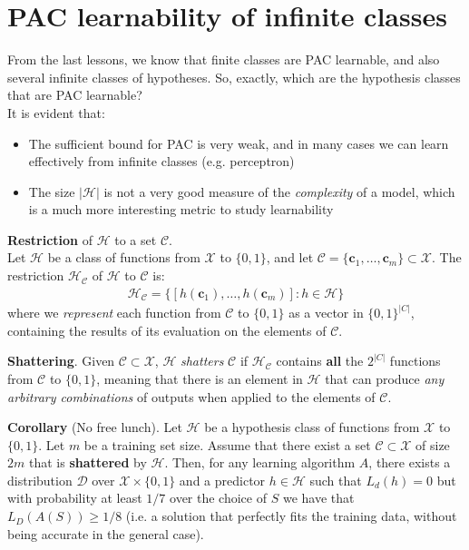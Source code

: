 \documentclass[../template.tex]{subfiles}
\begin{document}
\section{PAC learnability of infinite classes}
From the last lessons, we know that finite classes are PAC learnable, and also several infinite classes of hypotheses. So, exactly, which are the hypothesis classes that are PAC learnable?\\
It is evident that:
\begin{itemize}
    \item The sufficient bound for PAC is very weak, and in many cases we can learn effectively from infinite classes (e.g. perceptron)
    \item The size $|\mathcal{H}|$ is not a very good measure of the \textit{complexity} of a model, which is a much more interesting metric to study learnability  
\end{itemize}

\begin{dfn}
    \textbf{Restriction} of $\mathcal{H}$ to a set $\mathcal{C}$.\\
    Let $\mathcal{H}$ be a class of functions from $\mathcal{X}$ to $\{0,1\}$, and let $\mathcal{C} = \{\bm{c}_1, \dots, \bm{c}_m\} \subset \mathcal{X}$. The restriction $\mathcal{H}_{\mathcal{C}}$ of $\mathcal{H}$ to $\mathcal{C}$ is:
    \begin{align*}
        \mathcal{H}_{\mathcal{C}} = \{[h(\bm{c}_1), \dots, h(\bm{c}_m)] \colon h \in \mathcal{H}\}
    \end{align*}      
    where we \textit{represent} each function from $\mathcal{C}$ to $\{0,1\}$ as a vector in $\{0,1\}^{|C|}$, containing the results of its evaluation on the elements of $\mathcal{C}$.     
\end{dfn} 

\begin{dfn} \textbf{Shattering}. Given $\mathcal{C} \subset \mathcal{X}$, $\mathcal{H}$ \textit{shatters} $\mathcal{C}$ if $\mathcal{H}_{\mathcal{C}}$ contains \textbf{all} the $2^{|C|}$ functions from $\mathcal{C}$ to $\{0,1\}$, meaning that there is an element in $\mathcal{H}$ that can produce \textit{any arbitrary combinations} of outputs when applied to the elements of $\mathcal{C}$.             
\end{dfn}

\textbf{Corollary} (No free lunch). Let $\mathcal{H}$ be a hypothesis class of functions from $\mathcal{X}$ to $\{0,1\}$. Let $m$ be a training set size. Assume that there exist a set $\mathcal{C}\subset \mathcal{X}$ of size $2m$ that is \textbf{shattered} by $\mathcal{H}$. Then, for any learning algorithm $A$, there exists a distribution $\mathcal{D}$ over $\mathcal{X}\times \{0,1\}$ and a predictor $h\in \mathcal{H}$ such that $L_d(h) = 0$ but with probability at least $1/7$ over the choice of $S$ we have that $L_D(A(S)) \geq 1/8$ (i.e. a solution that perfectly fits the training data, without being accurate in the general case).\\
\end{document}
